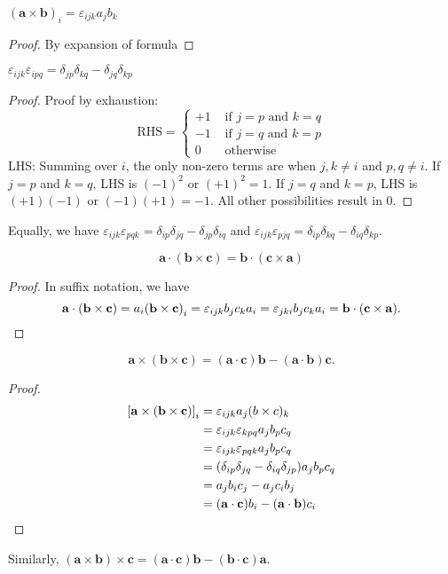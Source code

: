 \documentclass[a4paper]{article}
\begin{document}
\begin{prop}
  $(\mathbf{a} \times \mathbf{b})_i = \varepsilon_{ijk}a_jb_k$
\end{prop}

\begin{proof}
  By expansion of formula
\end{proof}

\begin{thm}
  $\varepsilon_{ijk}\varepsilon_{ipq} = \delta_{jp}\delta_{kq} - \delta_{jq}\delta_{kp}$
\end{thm}

\begin{proof}
  Proof by exhaustion:
  \[
    \text{RHS} = \begin{cases}
      +1 &\text{ if } j = p \text{ and } k = q\\
      -1 &\text{ if } j = q \text{ and } k = p\\
      0 &\text{ otherwise}
    \end{cases}
  \]
  LHS: Summing over $i$, the only non-zero terms are when $j, k\not=i$ and $p, q\not=i$. If $j = p$ and $k = q$, LHS is $(-1)^2$ or $(+1)^2 = 1$. If $j = q$ and $k = p$, LHS is $(+1)(-1)$ or $(-1)(+1) = -1$. All other possibilities result in 0.
\end{proof}
Equally, we have $\varepsilon_{ijk}\varepsilon_{pqk} = \delta_{ip}\delta_{jq} - \delta_{jp}\delta_{iq}$ and $\varepsilon_{ijk}\varepsilon_{pjq} = \delta_{ip}\delta_{kq} - \delta_{iq}\delta_{kp}$.

\begin{prop}
  \[
    \mathbf{a\cdot (b\times c) = b\cdot(c\times a)}
  \]
\end{prop}
\begin{proof}
  In suffix notation, we have
  \[
    \mathbf{a\cdot (b\times c)} = a_i\mathbf{(b\times c)}_i = \varepsilon_{ijk}b_jc_ka_i = \varepsilon_{jki}b_jc_ka_i = \mathbf{b\cdot (c\times a)}.\qedhere
  \]
\end{proof}

\begin{thm}
  \[
    \mathbf{a\times (b\times c) = (a\cdot c)b - (a\cdot b)c}.
  \]
\end{thm}
\begin{proof}
  \begin{align*}
    \mathbf{[a\times(b\times c)]}_i &= \varepsilon_{ijk} a_j(b\times c)_k \\
    &= \varepsilon_{ijk}\varepsilon_{kpq}a_jb_pc_q\\
    &= \varepsilon_{ijk}\varepsilon_{pqk} a_jb_pc_q\\
    &= (\delta_{ip}\delta_{jq}-\delta_{iq}\delta_{jp})a_jb_pc_q\\
    &= a_jb_ic_j - a_jc_ib_j\\
    &= \mathbf{(a\cdot c)}b_i - \mathbf{(a\cdot b)}c_i\qedhere
  \end{align*}
\end{proof}
Similarly, $\mathbf{(a\times b)\times c = (a\cdot c)b - (b\cdot c)a}$.
\end{document}
